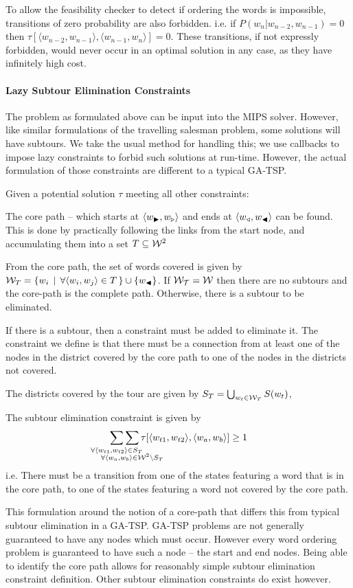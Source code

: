 \documentclass[twocolumn]{article}
\begin{document}
To allow the feasibility checker to detect if ordering the words is
impossible, transitions of zero probability are also forbidden. i.e. if \mbox{$P(w_{n}|w_{n-2},w_{n-1})=0$} then \mbox{$\tau[\langle w_{n-2},w_{n-1}\rangle,\langle w_{n-1},w_{n}\rangle]=0$}.
These transitions, if not expressly forbidden, would never occur in
an optimal solution in any case, as they have infinitely high cost.


\paragraph{Lazy Subtour Elimination Constraints}

The problem as formulated above can be input into the MIPS solver. However, like similar formulations of the
travelling salesman problem, some solutions will have subtours.
We take the usual method for handling this; we use callbacks to impose
lazy constraints to forbid such solutions at run-time.  
However, the actual formulation of those constraints are different to a typical GA-TSP.

Given a potential solution $\tau$ meeting all other constraints:

The core path -- which starts at $\langle w_{\blacktriangleright},w_{\triangleright}\rangle$
and ends at $\langle w_{\triangleleft},w_{\blacktriangleleft}\rangle$ can be found. This is done
by practically following the links from the start node, and accumulating
them into a set $T\subseteq\mathcal{W}^{2}$

From the core path, the set of words covered is given by $\mathcal{W}_{T}=\{w_{i}\,\mid\,\forall\langle w_{i},w_{j}\rangle\in T\,\}\cup\{w_{\blacktriangleleft}\}$.
If $\mathcal{W_{T}}=\mathcal{W}$ then there are no subtours and the core-path
is the complete path. Otherwise, there is a subtour to be eliminated.

If there is a subtour, then a constraint must be
added to eliminate it. The constraint we define is that there must be a connection from at least one of the nodes in the district covered by the core path to
one of the nodes in the districts not covered.

The districts covered by the tour are given by $S_{T}=\bigcup_{w_{t}\in \mathcal{W}_{T}}S(w_{t})$,

The subtour elimination constraint is given by 
\displayunskip
\begin{equation*}
  \sum_{\mathclap{\forall\langle w_{t1},w_{t2}\rangle\in S_{T}}}
  \sum_{\mathclap{\substack{\; \\ \;\\ \forall\langle w_{a},w_{b}\rangle\in\W^{2}\backslash S_{T}}}}
  \tau[\langle w_{t1},w_{t2}\rangle,\langle w_{a},w_{b}\rangle]\ge1
\end{equation*}
i.e. There must be a transition from one of the states featuring a
word that is in the core path, to one of the states featuring a word
not covered by the core path.


This formulation around the notion of a core-path that differs this from typical subtour elimination in a GA-TSP. GA-TSP problems are not generally guaranteed to have any nodes which must occur. However every word ordering problem is guaranteed to have such a node -- the start and end nodes. Being able to identify the core path allows for reasonably simple subtour elimination constraint definition. Other subtour elimination constraints do exist however.
\end{document}
